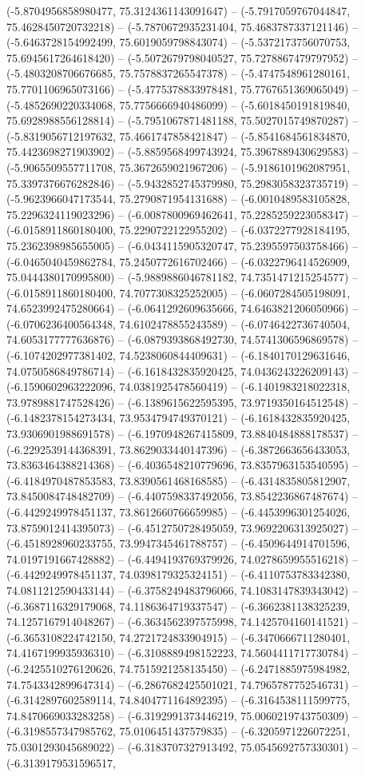 (-5.8704956858980477, 75.3124361143091647) -- (-5.7917059767044847, 75.4628450720732218) -- (-5.7870672935231404, 75.4683787337121146) -- (-5.6463728154992499, 75.6019059798843074) -- (-5.5372173756070753, 75.6945617264618420) -- (-5.5072679798040527, 75.7278867479797952) -- (-5.4803208706676685, 75.7578837265547378) -- (-5.4747548961280161, 75.7701106965073166) -- (-5.4775378833978481, 75.7767651369065049) -- (-5.4852690220334068, 75.7756666940486099) -- (-5.6018450191819840, 75.6928988556128814) -- (-5.7951067871481188, 75.5027015749870287) -- (-5.8319056712197632, 75.4661747858421847) -- (-5.8541684561834870, 75.4423698271903902) -- (-5.8859568499743924, 75.3967889430629583) -- (-5.9065509557711708, 75.3672659021967206) -- (-5.9186101962087951, 75.3397376676282846) -- (-5.9432852745379980, 75.2983058323735719) -- (-5.9623966047173544, 75.2790871954131688) -- (-6.0010489583105828, 75.2296324119023296) -- (-6.0087800969462641, 75.2285259223058347) -- (-6.0158911860180400, 75.2290722122955202) -- (-6.0372277928184195, 75.2362398985655005) -- (-6.0434115905320747, 75.2395597503758466) -- (-6.0465040459862784, 75.2450772616702466) -- (-6.0322796414526909, 75.0444380170995800) -- (-5.9889886046781182, 74.7351471215254577) -- (-6.0158911860180400, 74.7077308325252005) -- (-6.0607284505198091, 74.6523992475280664) -- (-6.0641292609635666, 74.6463821206050966) -- (-6.0706236400564348, 74.6102478855243589) -- (-6.0746422736740504, 74.6053177777636876) -- (-6.0879393868492730, 74.5741306596869578) -- (-6.1074202977381402, 74.5238060844409631) -- (-6.1840170129631646, 74.0750586849786714) -- (-6.1618432835920425, 74.0436243226209143) -- (-6.1590602963222096, 74.0381925478560419) -- (-6.1401983218022318, 73.9789881747528426) -- (-6.1389615622595395, 73.9719350164512548) -- (-6.1482378154273434, 73.9534794749370121) -- (-6.1618432835920425, 73.9306901988691578) -- (-6.1970948267415809, 73.8840484888178537) -- (-6.2292539144368391, 73.8629033440147396) -- (-6.3872663656433053, 73.8363464388214368) -- (-6.4036548210779696, 73.8357963153540595) -- (-6.4184970487853583, 73.8390561468168585) -- (-6.4314835805812907, 73.8450084748482709) -- (-6.4407598337492056, 73.8542236867487674) -- (-6.4429249978451137, 73.8612660766659985) -- (-6.4453996301254026, 73.8759012414395073) -- (-6.4512750728495059, 73.9692206313925027) -- (-6.4518928960233755, 73.9947345461788757) -- (-6.4509644914701596, 74.0197191667428882) -- (-6.4494193769379926, 74.0278659955516218) -- (-6.4429249978451137, 74.0398179325324151) -- (-6.4110753783342380, 74.0811212590433144) -- (-6.3758249483796066, 74.1083147839343042) -- (-6.3687116329179068, 74.1186364719337547) -- (-6.3662381138325239, 74.1257167914048267) -- (-6.3634562397575998, 74.1425704160141521) -- (-6.3653108224742150, 74.2721724833904915) -- (-6.3470666711280401, 74.4167199935936310) -- (-6.3108889498152223, 74.5604411717730784) -- (-6.2425510276120626, 74.7515921258135450) -- (-6.2471885975984982, 74.7543342899647314) -- (-6.2867682425501021, 74.7965787752546731) -- (-6.3142897602589114, 74.8404771164892395) -- (-6.3164538111599775, 74.8470669033283258) -- (-6.3192991373446219, 75.0060219743750309) -- (-6.3198557347985762, 75.0106451437579835) -- (-6.3205971226072251, 75.0301293045689022) -- (-6.3183707327913492, 75.0545692757330301) -- (-6.3139179531596517, 